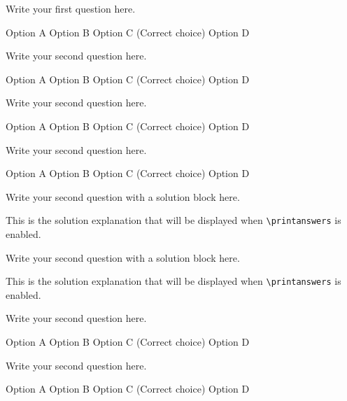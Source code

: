 \documentclass[a4paper,14pt,oneside]{hcmusexam}
\begin{document}
\addnamebox


\begin{questions}
    \addpoints
    \question Write your first question here.
    \begin{choices}
        \choice Option A
        \choice Option B
        \correctchoice Option C (Correct choice)
        \choice Option D
    \end{choices}
    
    \question Write your second question here.

    \begin{oneparchoices}
        \choice Option A
        \choice Option B
        \correctchoice Option C (Correct choice)
        \choice Option D
    \end{oneparchoices}
    
    \question Write your second question here.

    \begin{oneparchoices}
        \choice Option A
        \choice Option B
        \correctchoice Option C (Correct choice)
        \choice Option D
    \end{oneparchoices}
    \question Write your second question here.

    \begin{oneparchoices}
        \choice Option A
        \choice Option B
        \correctchoice Option C (Correct choice)
        \choice Option D
    \end{oneparchoices}

    \question Write your second question with a solution block here.
    \begin{solution}
        This is the solution explanation that will be displayed when \texttt{\textbackslash printanswers} is enabled.
    \end{solution}
    
    \question Write your second question with a solution block here.
    \begin{solution}
        This is the solution explanation that will be displayed when \texttt{\textbackslash printanswers} is enabled.
    \end{solution}

    \question Write your second question here.

    \begin{oneparchoices}
        \choice Option A
        \choice Option B
        \correctchoice Option C (Correct choice)
        \choice Option D
    \end{oneparchoices}
    
    \question Write your second question here.

    \begin{oneparchoices}
        \choice Option A
        \choice Option B
        \correctchoice Option C (Correct choice)
        \choice Option D
    \end{oneparchoices}

\end{questions}
\vfill
\end{document}
